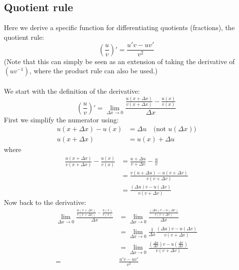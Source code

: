 \documentclass{report}
\begin{document}
\subsection{Quotient rule} %
Here we derive a specific function for differentiating quotients (fractions), the quotient rule:
\begin{equation*}
\left(\frac{u}{v}\right)'=\frac{u'v-uv'}{v^2}
\end{equation*}
(Note that this can simply be seen as an extension of taking the derivative of
$(uv^{-1})$, where the product rule can also be used.)\\
\vspace{2mm}\\
We start with the definition of the derivative:
\begin{equation*}
\left(\frac{u}{v}\right)'=\lim_{\Delta x\to0}\frac{\frac{u(x+\Delta x)}{v(x+\Delta x)}
-\frac{u(x)}{v(x)}}{\Delta x}
\end{equation*}
First we simplify the numerator using:
\begin{align*}
u(x+\Delta x)-u(x)&=\Delta u\quad\text{(not $u(\Delta x)$)}\\
u(x+\Delta x)&=u(x)+\Delta u 
\end{align*}
where
\begin{align*}
\frac{u(x+\Delta x)}{v(x+\Delta x)}-\frac{u(x)}{v(x)}&=\frac{u+\Delta u}{v+\Delta v}
-\frac{u}{v}\\
&=\frac{v(u+\Delta u)-u(v+\Delta v)}{v(v+\Delta v)}\\
&=\frac{(\Delta u)v-u(\Delta v)}{v(v+\Delta v)}
\end{align*}
Now back to the derivative:
\begin{align*}
\lim_{\Delta x\to0}\frac{\frac{u(x+\Delta x)}{v(x+\Delta x)}-\frac{u(x)}{v(x)}}{\Delta x}
&=\lim_{\Delta x\to0}\frac{\frac{(\Delta u)v-u(\Delta v)}{v(v+\Delta v)}}{\Delta x}\\
&=\lim_{\Delta x\to0}\frac{1}{\Delta x}\frac{(\Delta u)v-u(\Delta v)}{v(v+\Delta v)}\\
&=\lim_{\Delta x\to0}\frac{\left(\frac{\Delta u}{\Delta x}\right)v
-u\left(\frac{\Delta v}{\Delta x}\right)}{v(v+\Delta v)}\\
=&\frac{u'v-uv'}{v^2}
\end{align*}
\newpage
\end{document}
